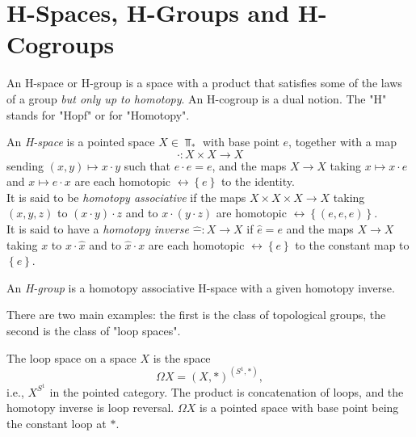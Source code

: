 \section{H-Spaces, H-Groups and H-Cogroups}

An H-space or H-group is a space with a product that satisfies
some of the laws of a group \textit{but only up to homotopy}.
An H-cogroup is a dual notion. The
"H" stands for "Hopf" or for "Homotopy".

\begin{definition}
    An \textit{H-space} is a pointed space $X \in \Top_*$ with
    base point $e$, together with a map
    \[
    \cdot \colon X \times X \to X
    \] 
    sending $\left( x,y \right) \mapsto x \cdot y$ such that
    $e \cdot  e = e$, and the maps
    $X \to X$ taking $x \mapsto x \cdot e$ and
    $x \mapsto e \cdot x$ are each homotopic 
    $\rel \left\{ e \right\} $ to the identity.\\
    \linebreak
    It is said to be \textit{homotopy associative} if the
    maps $X \times X \times X \to X$ taking
    $\left( x,y,z \right) $ to
    $\left( x \cdot y \right) \cdot z$ and
    to $x \cdot  \left( y \cdot z \right) $ are
    homotopic $\rel \left\{ \left( e,e,e \right)  \right\} $.\\
    \linebreak
    It is said to have a \textit{homotopy inverse}
    $\hat{-} \colon X \to X$ if
    $\hat{e} = e$ and the maps
    $X \to X$ taking $x$ to
    $x \cdot \hat{x}$ and to
    $\hat{x}\cdot x$ are each homotopic $\rel \left\{ e \right\} $ 
    to the constant map to $\left\{ e \right\} $.
\end{definition}

\begin{definition}[H-group]
    An \textit{H-group} is a homotopy associative H-space
    with a given homotopy inverse.
\end{definition}

There are two main examples: the first
is the class of topological groups, the second is the class
of "loop spaces". 

\begin{definition}
    The loop space on a space $X$ is the space
    \[
    \Omega X = \left( X,* \right)^{\left( S^{1},* \right) },
    \] 
    i.e., $X^{S^{1}}$ in the pointed category. 
    The product is concatenation of loops, and
    the homotopy inverse is loop reversal.
    $\Omega X$ is a pointed space with base point being
    the constant loop at $*$.
\end{definition}

